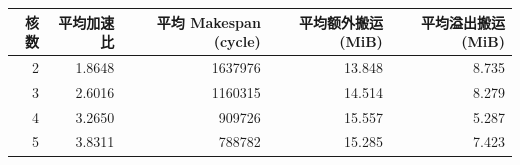 \begin{tabular}{rrrrr}
\toprule
核数 & 平均加速比 & 平均 Makespan (cycle) & 平均额外搬运 (MiB) & 平均溢出搬运 (MiB) \\
\midrule
2 & 1.8648 & 1637976 & 13.848 & 8.735 \\
3 & 2.6016 & 1160315 & 14.514 & 8.279 \\
4 & 3.2650 & 909726 & 15.557 & 5.287 \\
5 & 3.8311 & 788782 & 15.285 & 7.423 \\
\bottomrule
\end{tabular}

